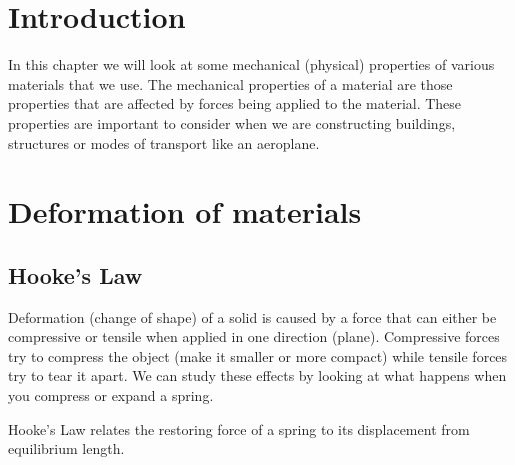 \section {Introduction}

In this chapter we will look at some mechanical (physical) properties of various materials that we use. The mechanical properties of a material are those properties that are affected by forces being applied to the material. These properties are important to consider when we are constructing buildings, structures or modes of transport like an aeroplane.
  
\section{Deformation of materials}

\subsection{Hooke's Law}

Deformation (change of shape) of a solid is caused by a force that can either be compressive or tensile when applied in one direction (plane). Compressive forces try to compress the object (make it smaller or more compact) while tensile forces try to tear it apart.
We can study these effects by looking at what happens when you compress or expand a spring.
 
Hooke's Law relates the restoring force of a spring to its displacement from equilibrium length.

